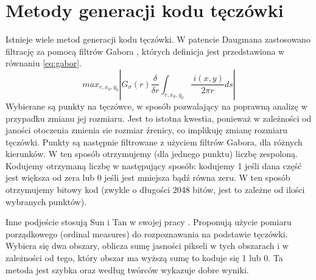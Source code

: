 \section{Metody generacji kodu tęczówki}
\label{sec:metodyGeneracjiKodu}

Istnieje wiele metod generacji kodu tęczówki. W patencie Daugmana zastosowano filtrację za pomocą filtrów Gabora \cite{Daugman}, których definicja jest przedstawiona w równaniu \ref{eq:gabor}.
\begin{equation}
\label{eq:daugman}
max_{r,x_{0},y_{0}}\left| G_{\sigma}(r) \frac{\delta}{\delta r}\int_{r,x_{0},y_{0}} \frac{~i(x,y)}{2\pi r}ds \right|
\end{equation}
Wybierane są punkty na tęczówce, w sposób pozwalający na poprawną analizę w przypadku zmianu jej rozmiaru. Jest to istotna kwestia, ponieważ w zależności od janości otoczenia zmienia sie rozmiar źrenicy, co implikuję zmianę rozmiaru tęczówki. Punkty są następnie filtrowane z użyciem filtrów Gabora, dla różnych kierunków. W ten sposób otrzymujemy (dla jednego punktu) liczbę zespoloną. Kodujemy otrzymaną liczbę w następujący sposób: kodujemy 1 jeśli dana część jest większa od zera lub 0 jeśli jest mniejsza bądź równa zeru. W ten sposób otrzymujemy bitowy kod (zwykle o długości 2048 bitów, jest to zależne od ilości wybranych punktów).

Inne podjeście stosują Sun i Tan w swojej pracy \cite{TaSu09}. Proponują użycie pomiaru porządkowego (ordinal measures) do rozpoznawania na podstawie tęczówki. Wybiera się dwa obszary, oblicza sumę jasności pikseli w tych obszarach i w zależności od tego, który obszar ma wyższą sumę to koduje się 1 lub 0. Ta metoda jest szybka oraz według twórców wykazuje dobre wyniki.
